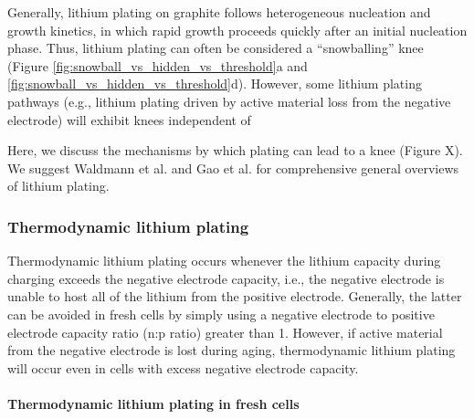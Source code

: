 \documentclass[journal=jpcl, manuscript=article, layout=onecolumn]{achemso}
\begin{document}
Generally, lithium plating on graphite follows heterogeneous nucleation and growth kinetics, in which rapid growth proceeds quickly after an initial nucleation phase.\cite{ely_heterogeneous_2013, pei_nanoscale_2017}
Thus, lithium plating can often be considered a ``snowballing'' knee (Figure \ref{fig:snowball_vs_hidden_vs_threshold}a and \ref{fig:snowball_vs_hidden_vs_threshold}d). However, some lithium plating pathways (e.g., lithium plating driven by active material loss from the negative electrode) will exhibit knees independent of 

Here, we discuss the mechanisms by which plating can lead to a knee (Figure X). We suggest Waldmann et al.\cite{waldmann_li_2018} and Gao et al.\cite{gao_interplay_2021} for comprehensive general overviews of lithium plating.


\subsubsection{Thermodynamic lithium plating}


Thermodynamic lithium plating occurs whenever the lithium capacity during charging exceeds the negative electrode capacity, i.e., the negative electrode is unable to host all of the lithium from the positive electrode. Generally, the latter can be avoided in fresh cells by simply using a negative electrode to positive electrode capacity ratio (n:p ratio) greater than 1. However, if active material from the negative electrode is lost during aging, thermodynamic lithium plating will occur even in cells with excess negative electrode capacity.

\paragraph{Thermodynamic lithium plating in fresh cells}
\end{document}
